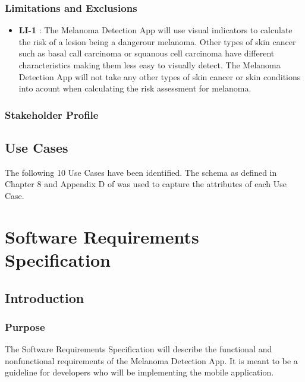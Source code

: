     \subsubsection{Limitations and Exclusions}

        \noindent
        \begin{itemize}[leftmargin=*]
            \item[]  \textbf{LI-1} : The Melanoma Detection App will use visual indicators to calculate the risk of a lesion being a dangerour melanoma. Other types of skin cancer such as basal call carcinoma or squanous cell carcinoma have different characteristics making them less easy to visually detect. The Melanoma Detection App will not take any other types of skin cancer or skin conditions into acount when calculating the risk assessment for melanoma.

        \end{itemize}

    \subsubsection{Stakeholder Profile}



    \subsection{Use Cases}

        The following 10 Use Cases have been identified. The schema as defined in Chapter 8 and Appendix D of \cite{wiegers2013software}  was used to capture the attributes of each Use Case.

        


\section{Software Requirements Specification}

    \subsection{Introduction}
        \subsubsection{Purpose}

            The Software Requirements Specification will describe the functional and nonfunctional requirements of the Melanoma Detection App. It is meant to be a guideline for developers who will be implementing the mobile application.

